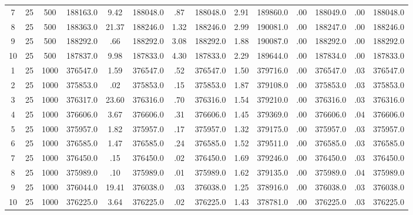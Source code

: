 \documentclass[12pt,a4paper]{article}
\begin{document}
\begin{center}
{\begin{tabular}{|ccc|cc|cc|cc|cc|cc|c|}
7             &  25& 500& 188163.0& 9.42& 188048.0&  .87& 188048.0& 2.91& 189860.0&  .00& 188049.0&  .00& 188048.0\\[-0.01in]
8             &  25& 500& 188363.0&21.37& 188246.0& 1.32& 188246.0& 2.99& 190081.0&  .00& 188247.0&  .00& 188246.0\\[-0.01in]
9             &  25& 500& 188292.0&  .66& 188292.0& 3.08& 188292.0& 1.88& 190087.0&  .00& 188292.0&  .00& 188292.0\\[-0.01in]
10            &  25& 500& 187837.0& 9.98& 187833.0& 4.30& 187833.0& 2.29& 189644.0&  .00& 187834.0&  .00& 187833.0\\[-0.01in]
1             &  25&1000& 376547.0& 1.59& 376547.0&  .52& 376547.0& 1.50& 379716.0&  .00& 376547.0&  .03& 376547.0\\[-0.01in]
2             &  25&1000& 375853.0&  .02& 375853.0&  .15& 375853.0& 1.87& 379108.0&  .00& 375853.0&  .03& 375853.0\\[-0.01in]
3             &  25&1000& 376317.0&23.60& 376316.0&  .70& 376316.0& 1.54& 379210.0&  .00& 376316.0&  .03& 376316.0\\[-0.01in]
4             &  25&1000& 376606.0& 3.67& 376606.0&  .31& 376606.0& 1.45& 379369.0&  .00& 376606.0&  .04& 376606.0\\[-0.01in]
5             &  25&1000& 375957.0& 1.82& 375957.0&  .17& 375957.0& 1.32& 379175.0&  .00& 375957.0&  .03& 375957.0\\[-0.01in]
6             &  25&1000& 376585.0& 1.47& 376585.0&  .24& 376585.0& 1.52& 379511.0&  .00& 376585.0&  .03& 376585.0\\[-0.01in]
7             &  25&1000& 376450.0&  .15& 376450.0&  .02& 376450.0& 1.69& 379246.0&  .00& 376450.0&  .03& 376450.0\\[-0.01in]
8             &  25&1000& 375989.0&  .10& 375989.0&  .01& 375989.0& 1.62& 379135.0&  .00& 375989.0&  .04& 375989.0\\[-0.01in]
9             &  25&1000& 376044.0&19.41& 376038.0&  .03& 376038.0& 1.25& 378916.0&  .00& 376038.0&  .03& 376038.0\\[-0.01in]
10            &  25&1000& 376225.0& 3.64& 376225.0&  .02& 376225.0& 1.43& 378781.0&  .00& 376225.0&  .03& 376225.0\\[-0.01in]
\hline
\end{tabular}
 }
\end{center}
\end{document}
